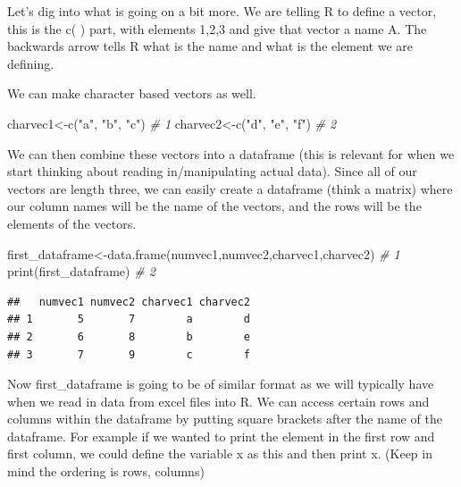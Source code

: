 \documentclass[
]{book}
\newenvironment{Shaded}{\begin{snugshade}}{\end{snugshade}}
\newcommand{\CommentTok}[1]{\textcolor[rgb]{0.56,0.35,0.01}{\textit{#1}}}
\newcommand{\FunctionTok}[1]{\textcolor[rgb]{0.00,0.00,0.00}{#1}}
\newcommand{\NormalTok}[1]{#1}
\newcommand{\OtherTok}[1]{\textcolor[rgb]{0.56,0.35,0.01}{#1}}
\newcommand{\StringTok}[1]{\textcolor[rgb]{0.31,0.60,0.02}{#1}}
\begin{document}
Let's dig into what is going on a bit more. We are telling R to define a vector, this is the c( ) part, with elements 1,2,3 and give that vector a name A. The backwards arrow tells R what is the name and what is the element we are defining.

We can make character based vectors as well.

\begin{Shaded}
\begin{Highlighting}[numbers=left,,]
\NormalTok{charvec1}\OtherTok{\textless{}{-}}\FunctionTok{c}\NormalTok{(}\StringTok{"a"}\NormalTok{, }\StringTok{"b"}\NormalTok{, }\StringTok{"c"}\NormalTok{)  }\CommentTok{\# 1}
\NormalTok{charvec2}\OtherTok{\textless{}{-}}\FunctionTok{c}\NormalTok{(}\StringTok{"d"}\NormalTok{, }\StringTok{"e"}\NormalTok{, }\StringTok{"f"}\NormalTok{)  }\CommentTok{\# 2}
\end{Highlighting}
\end{Shaded}

We can then combine these vectors into a dataframe (this is relevant for when we start thinking about reading in/manipulating actual data). Since all of our vectors are length three, we can easily create a dataframe (think a matrix) where our column names will be the name of the vectors, and the rows will be the elements of the vectors.

\begin{Shaded}
\begin{Highlighting}[numbers=left,,]
\NormalTok{first\_dataframe}\OtherTok{\textless{}{-}}\FunctionTok{data.frame}\NormalTok{(numvec1,numvec2,charvec1,charvec2)  }\CommentTok{\# 1}
\FunctionTok{print}\NormalTok{(first\_dataframe)                                          }\CommentTok{\# 2}
\end{Highlighting}
\end{Shaded}

\begin{verbatim}
##   numvec1 numvec2 charvec1 charvec2
## 1       5       7        a        d
## 2       6       8        b        e
## 3       7       9        c        f
\end{verbatim}

Now first\_dataframe is going to be of similar format as we will typically have when we read in data from excel files into R. We can access certain rows and columns within the dataframe by putting square brackets after the name of the dataframe. For example if we wanted to print the element in the first row and first column, we could define the variable x as this and then print x. (Keep in mind the ordering is rows, columns)
\end{document}
